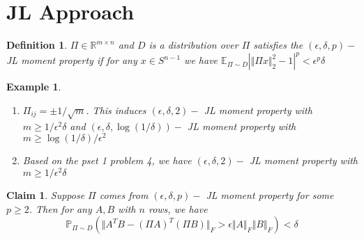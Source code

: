 \documentclass[11pt]{article}
\newtheorem{definition}[theorem]{Definition}
\newtheorem{claim}[theorem]{Claim}
\newtheorem{example}[theorem]{Example}
\begin{document}
\section{JL Approach}
\begin{definition}
$\Pi\in\mathbb{R}^{m\times n}$ and $D$ is a distribution over $\Pi$ satisfies the $(\epsilon,\delta, p)-$JL moment property if for any $x\in S^{n-1}$ we have $\mathbb{E}_{\Pi\sim D}|\Vert \Pi x\Vert_2^2-1|^p<\epsilon^p\delta$
\end{definition}
\begin{example}
\begin{enumerate}
\item $\Pi_{ij} = \pm 1/\sqrt{m}$. This induces $(\epsilon, \delta, 2)-$ JL moment property with $m\geq 1/\epsilon^2\delta$ and $(\epsilon, \delta, \log(1/\delta))-$ JL moment property with $m\geq \log(1/\delta)/\epsilon^2$
\item Based on the pset 1 problem 4, we have $(\epsilon, \delta, 2)-$ JL moment property with $m\geq 1/\epsilon^2\delta$
\end{enumerate}

\end{example}
\begin{claim}
Suppose $\Pi$ comes from $(\epsilon, \delta, p)-$ JL moment property for some $p\geq 2$. Then for any $A,B$ with $n$ rows, we have 
\begin{equation}
\mathbb{P}_{\Pi\sim D}(\Vert A^TB-(\Pi A)^T(\Pi B)\Vert_F>\epsilon\Vert A\Vert_F\Vert B\Vert_F) < \delta
\end{equation}
\end{claim}
\end{document}
